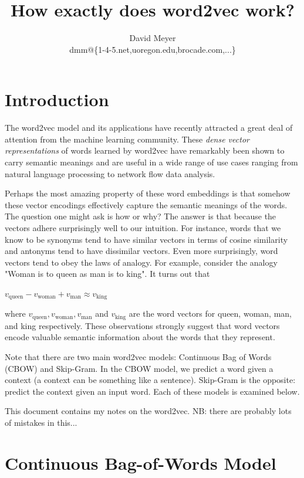 \documentclass[11pt, oneside]{article}   	%
\title{How exactly does word2vec work?}
\author{David Meyer \\ dmm@\{1-4-5.net,uoregon.edu,brocade.com,...\}}
\begin{document}
\maketitle

\section{Introduction} 
\label{sec:intro}
The word2vec model \cite{Mikolov2014} and its applications have recently attracted a great deal of attention from the machine learning community. These \emph{dense vector representations} of words learned by word2vec have remarkably been shown to carry semantic meanings and are useful in a wide range of use cases ranging from natural language processing to network flow data analysis.

\bigskip
\noindent
Perhaps the most  amazing property of these word embeddings is that somehow these vector encodings effectively capture the semantic meanings of the words. The question one might ask is how or why?  The answer is that because the vectors adhere surprisingly well to our intuition. For instance, words that we know to be synonyms tend to have similar vectors in terms of cosine similarity and antonyms tend to have dissimilar vectors. Even more surprisingly, word vectors tend to obey the laws of analogy. For example, consider the analogy "Woman is to queen as man is to king". It turns out that
\begin{center}
$v_{\text{queen}} -  v_{\text{woman}} + v_{\text{man}} \approx v_{\text{king}}$
\end{center}

\noindent
where $v_{\text{queen}}, v_{\text{woman}} ,v_{\text{man}}$ and $ v_{\text{king}}$ are the word vectors for queen, woman, man, and king respectively. These observations strongly suggest that word vectors encode valuable semantic information about the words that they represent.


\bigskip
\noindent
Note that there are two main word2vec models: Continuous Bag of Words (CBOW) and Skip-Gram. In the CBOW model, we predict a word given a context (a context can be something like a sentence).  Skip-Gram is the opposite: predict the context given an input word. Each of these models is examined below.

\bigskip
\noindent
This document contains my notes on the word2vec. NB: there are probably lots of mistakes in this...

\section{Continuous Bag-of-Words Model}
\end{document}
